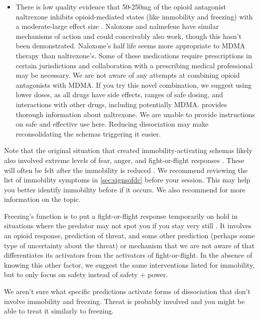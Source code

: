 \documentclass[12pt,letterpaper]{book}
\begin{document}
\begin{itemize}
	\item There is low quality evidence that 50-250mg of the opioid antagonist naltrexone inhibits opioid-mediated states (like immobility and freezing) with a moderate-large effect size \cite{escamilla2023treatment}. Naloxone and nalmefene have similar mechanisms of action and could conceivably also work, though this hasn't been demonstrated. Naloxone's half life seems more appropriate to MDMA therapy than naltrexone's. Some of these medications require prescriptions in certain jurisdictions and collaboration with a prescribing medical professional may be necessary. We are not aware of any attempts at combining opioid antagonists with MDMA. If you try this novel combination, we suggest using lower doses, as all drugs have side effects, ranges of safe dosing, and interactions with other drugs, including potentially MDMA. \textcite{naltrexoneInfo} provides thorough information about naltrexone. We are unable to provide instructions on safe and effective use here. Reducing dissociation may make reconsolidating the schemas triggering it easier.
\end{itemize}
Note that the original situation that created immobility-activating schemas likely also involved extreme levels of fear, anger, and fight-or-flight responses \cite{kozlowskaDefenseCascade}. These will often be felt after the immobility is reduced \cite{razviPSIP}. We recommend reviewing the list of immobility symptoms in \ref{sec:signsofdc} before your session. This may help you better identify immobility before if it occurs. We also recommend \textcite{razviDissociation} for more information on the topic.

Freezing's function is to put a fight-or-flight response temporarily on hold in situations where the predator may not spot you if you stay very still \cite{kozlowskaDefenseCascade}. It involves an opioid response, prediction of threat, and some other prediction (perhaps some type of uncertainty about the threat) or mechanism that we are not aware of that differentiates its activators from the activators of fight-or-flight. In the absence of knowing this other factor, we suggest the same interventions listed for immobility, but to only focus on safety instead of safety + power.

We aren't sure what specific predictions activate forms of dissociation that don't involve immobility and freezing. Threat is probably involved and you might be able to treat it similarly to freezing.
\end{document}
